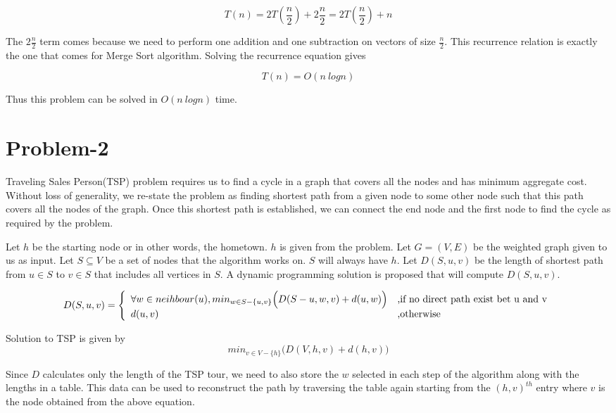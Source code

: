 \documentclass{article}
\begin{document}
\[ 
T(n) = 2T(\frac{n}{2}) + 2\frac{n}{2} = 2T(\frac{n}{2}) + n
\]

The $2\frac{n}{2}$ term comes because we need to perform one addition and one subtraction on vectors of size $\frac{n}{2}$. This recurrence relation is exactly the one that comes for Merge Sort algorithm. Solving the recurrence equation gives

\[
T(n) = O(n\ logn)
\]
 
Thus this problem can be solved in $O(n\ logn)$ time.

\section{Problem-2}
Traveling Sales Person(TSP) problem requires us to find a cycle in a graph that covers all the nodes and has minimum aggregate cost. Without loss of generality, we re-state the problem as finding shortest path from a given node to some other node such that this path covers all the nodes of the graph. Once this shortest path is established, we can connect the end node and the first node to find the cycle as required by the problem. 

Let $h$ be the starting node or in other words, the hometown. $h$ is given from the problem. Let $G=(V,E)$ be the weighted graph given to us as input. Let $S\subseteq V$ be a set of nodes that the algorithm works on. $S$ will always have $h$. Let $D(S,u,v)$ be the length of shortest path from $u \in S$ to $v \in S$ that includes all vertices in $S$. A dynamic programming solution is proposed that will compute $D(S,u,v)$. 

\[
  D(S,u,v) = \left\{ 
  \begin{array}{l l}
	  \forall w \in neihbour(u), min_{w \in S-\{u,v\}} \Big( D(S-{u},w,v) + d(u,w) \Big) & \text{,if no direct path exist bet u and v}\\
	  d(u,v) &  \text{,otherwise}\\
  \end{array} \right.
\]

Solution to TSP is given by 
\[
min_{ v \in V-\{h\} } \Big( D(V, h, v) + d(h,v) \Big)
\]


Since $D$ calculates only the length of the TSP tour, we need to also store the $w$ selected in each step of the algorithm along with the lengths in a table. This data can be used to reconstruct the path by traversing the table again starting from the $(h,v)^{th}$ entry where $v$ is the node obtained from the above equation.
\end{document}
